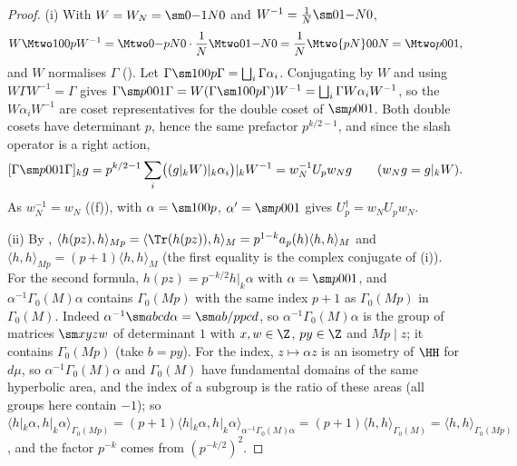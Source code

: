 \begin{proof}
(i) With $W=W_N=\sm0{-1}N0$ and $W^{-1}=\frac1N\sm01{-N}0$,
\[
W\Mtwo100pW^{-1}=\Mtwo0{-p}N0\cdot\frac1N\Mtwo01{-N}0=\frac1N\Mtwo{pN}00N=\Mtwo p001,
\]
and $W$ normalises $\Gamma$ (). Let $\Gamma\sm100p\Gamma=\bigsqcup_i\Gamma\alpha_i$. Conjugating by $W$ and using $W\Gamma W^{-1}=\Gamma$ gives
$\Gamma\sm p001\Gamma=W(\Gamma\sm100p\Gamma)W^{-1}=\bigsqcup_i\Gamma W\alpha_iW^{-1}$, so the $W\alpha_iW^{-1}$ are coset representatives for the double coset of $\sm p001$. Both double cosets
have determinant $p$, hence the same prefactor $p^{k/2-1}$, and since the slash operator is a right action,
\[
[\Gamma\sm p001\Gamma]_kg=p^{k/2-1}\sum_i\bigl((g|_kW)|_k\alpha_i\bigr)|_kW^{-1}=w_N^{-1}U_pw_Ng\qquad(w_Ng=g|_kW).
\] As $w_N^{-1}=w_N$ ((f)),  with $\alpha=\sm100p$,
$\alpha'=\sm p001$ gives $U_p^\dagger=w_NU_pw_N$.

(ii) By , $\langle h(pz),h\rangle_{Mp}=\langle\Tr(h(pz)),h\rangle_M=p^{1-k}a_p(h)\langle h,h\rangle_M$ and $\langle h,h\rangle_{Mp}=(p+1)\langle h,h\rangle_M$ (the first equality is the complex conjugate of (i)). For the second formula, $h(pz)=p^{-k/2}h|_k\alpha$ with $\alpha=\sm p001$, and
$\alpha^{-1}\Gamma_0(M)\alpha$ contains $\Gamma_0(Mp)$ with the same index $p+1$ as $\Gamma_0(Mp)$ in $\Gamma_0(M)$. Indeed $\alpha^{-1}\sm abcd\alpha=\sm a{b/p}{pc}d$, so
$\alpha^{-1}\Gamma_0(M)\alpha$ is the group of matrices $\sm x{y}{z}w$ of determinant $1$ with $x,w\in\Z$, $py\in\Z$ and $Mp\mid z$; it contains $\Gamma_0(Mp)$ (take $b=py$). For the index,
$z\mapsto\alpha z$ is an isometry of $\HH$ for $d\mu$, so $\alpha^{-1}\Gamma_0(M)\alpha$ and $\Gamma_0(M)$ have fundamental domains of the same hyperbolic area, and the index of a subgroup
is the ratio of these areas (all groups here contain $-1$); so
$\langle h|_k\alpha,h|_k\alpha\rangle_{\Gamma_0(Mp)}=(p+1)\langle h|_k\alpha,h|_k\alpha\rangle_{\alpha^{-1}\Gamma_0(M)\alpha}=(p+1)\langle h,h\rangle_{\Gamma_0(M)}=\langle h,h\rangle_{\Gamma_0(Mp)}$, and the factor $p^{-k}$ comes from $(p^{-k/2})^2$.
\end{proof}

